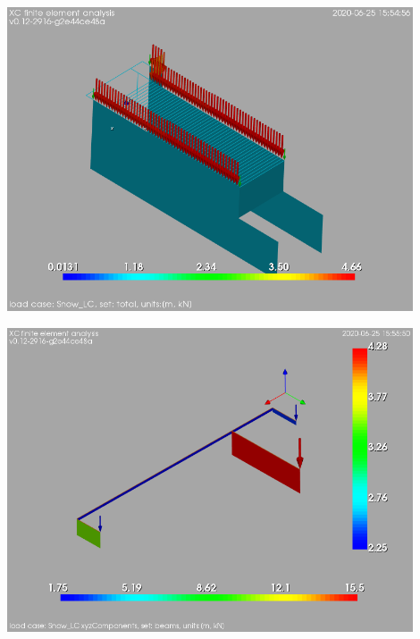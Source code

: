 \begin{Figure}
    \centering
   \includegraphics[width=120mm]{ramp_wall/figures/snow_load_over_ramp_wall}
\end{Figure}

\begin{Figure}
    \centering
    \includegraphics[width=120mm]{ramp_wall/figures/snow_load_over_steel_beams}
\end{Figure}

